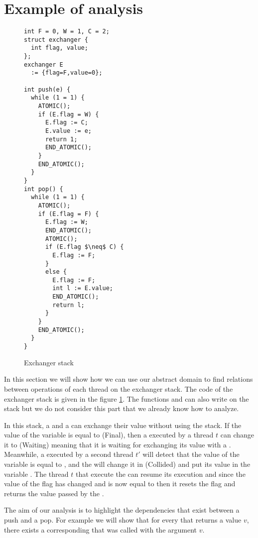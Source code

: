 \section{Example of analysis}
\label{sec:example}

\begin{figure}
\begin{multicols}{2}
\begin{lstlisting}
int F = 0, W = 1, C = 2;
struct exchanger {
  int flag, value;
};
exchanger E 
  := {flag=F,value=0};

int push(e) {
  while (1 = 1) {
    ATOMIC();
    if (E.flag = W) {
      E.flag := C;
      E.value := e;
      return 1;
      END_ATOMIC();
    }
    END_ATOMIC();
  }
}
int pop() {
  while (1 = 1) {
    ATOMIC();
    if (E.flag = F) {
      E.flag := W;
      END_ATOMIC();
      ATOMIC();
      if (E.flag $\neq$ C) {
        E.flag := F;
      }
      else {
        E.flag := F;
        int l := E.value;
        END_ATOMIC();
        return l;
      }
    }
    END_ATOMIC();
  }
}
\end{lstlisting}
\end{multicols}
\caption{Exchanger stack}
\label{fig:exchangerstack}
\end{figure}


In this section we will show how we can use our abstract domain to find relations between operations of each thread on the exchanger stack. The code of the exchanger stack is given in the figure \ref{fig:exchangerstack}. 
The functions  and  can also write on the stack but we do not consider this part that we already know how to analyze. 

In this stack, a  and a  can exchange their value without using the stack. If the value of the variable  is equal to  (Final), then a  executed by a thread $t$ can change it to  (Waiting) meaning that it is waiting for exchanging its value with a . 
Meanwhile, a  executed by a second thread $t'$ will detect that the value of the  variable is equal to , and the  will change it in  (Collided) and put its value  in the variable . 
The thread $t$ that execute the  can resume its execution and since the value of the flag has changed and is now equal to  then it resets the flag and returns the value passed by the . 

The aim of our analysis is to highlight the dependencies that exist between a push and a pop. For example we will show that for every  that returns a value $v$, there exists a corresponding  that was called with the argument $v$.



